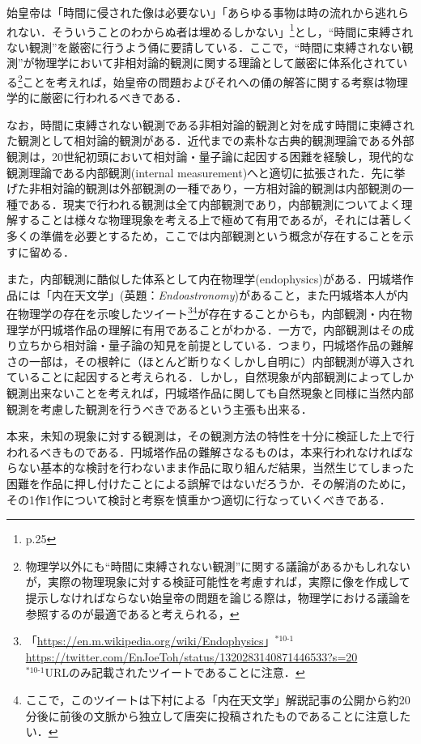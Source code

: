 \documentclass[10pt, a5paper, twoside]{jsarticle}
\theoremstyle{definition}
\begin{document}
			始皇帝は「時間に侵された像は必要ない」「あらゆる事物は時の流れから逃れられない．そういうことのわからぬ者は埋めるしかない」\footnote{\cite{mojika}p.25}とし，“時間に束縛されない観測”を厳密に行うよう俑に要請している\cite{com}．ここで，“時間に束縛されない観測”が物理学において非相対論的観測に関する理論として厳密に体系化されている\footnote{物理学以外にも“時間に束縛されない観測”に関する議論があるかもしれないが，実際の物理現象に対する検証可能性を考慮すれば，実際に像を作成して提示しなければならない始皇帝の問題を論じる際は，物理学における議論を参照するのが最適であると考えられる，}ことを考えれば，始皇帝の問題およびそれへの俑の解答に関する考察は物理学的に厳密に行われるべきである．

			なお，時間に束縛されない観測である非相対論的観測と対を成す時間に束縛された観測として相対論的観測がある．近代までの素朴な古典的観測理論である外部観測は，20世紀初頭において相対論・量子論に起因する困難を経験し，現代的な観測理論である内部観測(internal measurement)へと適切に拡張された．先に挙げた非相対論的観測は外部観測の一種であり，一方相対論的観測は内部観測の一種である．現実で行われる観測は全て内部観測であり，内部観測についてよく理解することは様々な物理現象を考える上で極めて有用であるが，それには著しく多くの準備を必要とするため，ここでは内部観測という概念が存在することを示すに留める．

			また，内部観測に酷似した体系として内在物理学(endophysics)がある．円城塔作品には「内在天文学」(英題：\textit{Endoastronomy})があること，また円城塔本人が内在物理学の存在を示唆したツイート\footnote{「\url{https://en.m.wikipedia.org/wiki/Endophysics}」$^{*10\text{-}1}$\url{https://twitter.com/EnJoeToh/status/1320283140871446533?s=20}\\$^{*10\text{-}1}$URLのみ記載されたツイートであることに注意．}\footnote{ここで，このツイートは下村による「内在天文学」解説記事\cite{endo}の公開から約20分後に前後の文脈から独立して唐突に投稿されたものであることに注意したい．}が存在することからも，内部観測・内在物理学が円城塔作品の理解に有用であることがわかる．一方で，内部観測はその成り立ちから相対論・量子論の知見を前提としている．つまり，円城塔作品の難解さの一部は，その根幹に（ほとんど断りなくしかし自明に）内部観測が導入されていることに起因すると考えられる．しかし，自然現象が内部観測によってしか観測出来ないことを考えれば，円城塔作品に関しても自然現象と同様に当然内部観測を考慮した観測を行うべきであるという主張も出来る．

			本来，未知の現象に対する観測は，その観測方法の特性を十分に検証した上で行われるべきものである．円城塔作品の難解さなるものは，本来行われなければならない基本的な検討を行わないまま作品に取り組んだ結果，当然生じてしまった困難を作品に押し付けたことによる誤解ではないだろうか．その解消のために，その1作1作について検討と考察を慎重かつ適切に行なっていくべきである．
\end{document}
